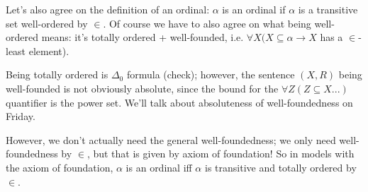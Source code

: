 \documentclass[a4paper]{article}
\begin{document}
Let's also agree on the definition of an ordinal: $\alpha$ is an ordinal if $\alpha$ is a transitive set well-ordered by $\in$. Of course we have to also agree on what being well-ordered means: it's totally ordered + well-founded, i.e. $\forall X (X \subseteq \alpha \to X$ has a $\in$-least element).

Being totally ordered is $\Delta_0$ formula (check); however, the sentence $(X,R)$ being well-founded is not obviously absolute, since the bound for the $\forall Z (Z \subseteq X ...)$ quantifier is the power set. We'll talk about absoluteness of well-foundedness on Friday.

However, we don't actually need the general well-foundedness; we only need well-foundedness by $\in$, but that is given by axiom of foundation! So in models with the axiom of foundation, $\alpha$ is an ordinal iff $\alpha$ is transitive and totally ordered by $\in$.	
\end{document}
